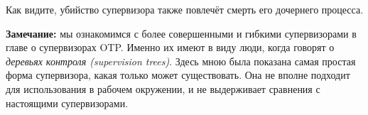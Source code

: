 Как видите, убийство супервизора также повлечёт смерть его дочернего процесса.

\colorbox{lgray}
{
\begin{minipage}{1.0\linewidth}
    \textbf{Замечание:} мы ознакомимся с более совершенными и гибкими супервизорами в главе о супервизорах OTP.
    Именно их имеют в виду люди, когда говорят о \emph{деревьях контроля (supervision trees)}.
    Здесь мною была показана самая простая форма супервизора, какая только может существовать.
    Она не вполне подходит для использования в рабочем окружении, и не выдерживает сравнения с настоящими супервизорами.

\end{minipage}
}
